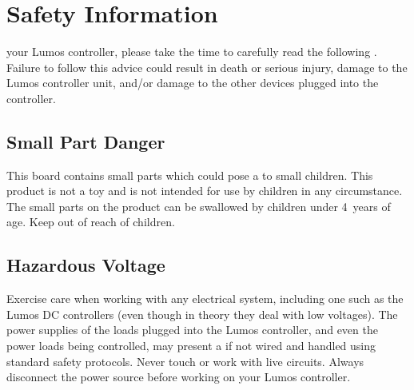 \documentclass[letterpaper,twoside,onecolumn,openright,final]{memoir}
\begin{document}
\chapter{Safety Information}\label{ch:safety}

 your Lumos controller, please take the time to
carefully read the following .  Failure to follow this advice could
result in death or serious injury, damage to the Lumos controller unit, and/or damage
to the other devices plugged into the controller.

%

\section{Small Part Danger}
This board contains small parts which could pose a  to small children.
This product is not a toy and is not intended for use by children in any circumstance.
The small parts on the product can be swallowed by children under 4~years of age. Keep
out of reach of children.

\section{Hazardous Voltage}
Exercise care when working with any electrical system, including one such as the Lumos DC
controllers (even though in theory they deal with low voltages).  The power supplies of the
loads plugged into the Lumos controller, and even the power loads being controlled, may present
a  if not wired and handled using standard safety protocols.  Never touch or work
with live circuits. Always disconnect the power source before working on your Lumos controller.
\end{document}
